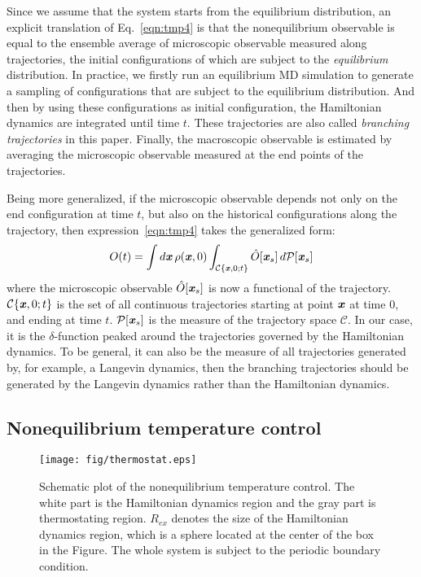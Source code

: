 \documentclass[a4paper,preprint,unsortedaddress,onecolumn]{revtex4-1}
\newcommand{\vect}[1]{\textbf{\textit{#1}}}
\begin{document}
Since we assume that the system starts from the equilibrium
distribution, an
explicit translation of Eq.~\eqref{eqn:tmp4} is that the
nonequilibrium observable is equal to the ensemble average of
microscopic observable measured along trajectories, the
initial configurations of which are subject to the \emph{equilibrium}
distribution. In practice, we firstly run an equilibrium MD simulation
to generate a sampling of configurations that are subject to the
equilibrium distribution. And then by using these configurations as
initial configuration, the Hamiltonian dynamics are integrated until
time $t$. These trajectories are also called \emph{branching
  trajectories} in this paper. Finally, the macroscopic observable is
estimated by averaging the microscopic observable measured at the end
points of the trajectories.

Being more generalized, if the microscopic observable depends not only on the end
configuration at time $t$, but also on the historical
configurations along the trajectory, then expression~\eqref{eqn:tmp4} takes the generalized form:
\begin{align}
  O(t) = \int d\vect x\,\rho(\vect x, 0) \int_{\mathcal C\{\vect x, 0; t\}} \hat O[\vect x_s] \,d\mathcal P[\vect x_s] 
\end{align}
where the microscopic observable $ \hat O[\vect x_s] $ is now a
functional of the trajectory.  $\mathcal C\{\vect x, 0; t\}$ is the
set of all continuous trajectories starting at point $\vect x$ at time
0, and ending at time $t$. $\mathcal P[\vect x_s] $ is the measure of
the trajectory space $\mathcal C$.  In our case, it is the
$\delta$-function peaked around the trajectories governed by the
Hamiltonian dynamics. To be general, it can also be the measure of all
trajectories generated by, for example, a Langevin dynamics, then the
branching trajectories should be generated by the Langevin
dynamics rather than the Hamiltonian dynamics.


\subsection{Nonequilibrium temperature control}\label{sec:tmp2b}


\begin{figure}
  \centering
  \texttt{[image: fig/thermostat.eps]}
  \caption{Schematic plot of the nonequilibrium temperature control.
    The white part is the Hamiltonian dynamics region
    and the gray part is thermostating region.
    $R_{ex}$ denotes the size of the Hamiltonian dynamics region, which
    is a sphere located at the center of the box in the Figure.
    The whole system
    is subject to the periodic boundary condition. }
  \label{fig:tmp2}
\end{figure}
\end{document}

